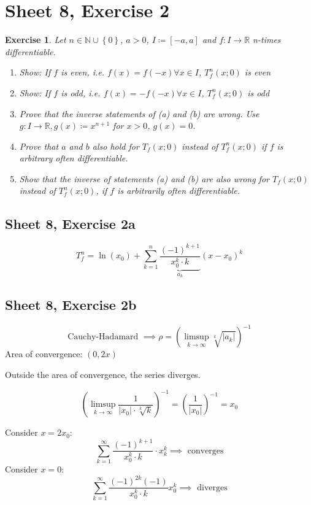 \documentclass{article}
\newtheorem{ex}{Exercise} %
\newcommand{\set}[1]{\left\{#1\right\}}
\newcommand{\card}[1]{\left|#1\right|}
\begin{document}
\section{Sheet 8, Exercise 2}
\begin{ex}
  Let $n \in \mathbb N \cup \set{0}$, $a > 0$, $I \coloneqq [-a, a]$ and $f: I \to \mathbb R$ n-times differentiable.
  \begin{enumerate}
    \item Show: If $f$ is even, i.e. $f(x) = f(-x) \forall x \in I$, $T_f^n(x; 0)$ is even
    \item Show: If $f$ is odd, i.e. $f(x) = -f(-x) \forall x \in I$, $T_f^n(x; 0)$ is odd
    \item Prove that the inverse statements of (a) and (b) are wrong.
      Use $g: I \to \mathbb R, g(x) \coloneqq x^{n+1}$ for $x > 0$, $g(x) = 0$.
    \item Prove that $a$ and $b$ also hold for $T_f(x; 0)$ instead of $T_f^n(x; 0)$ if $f$ is arbitrary often differentiable.
    \item Show that the inverse of statements (a) and (b) are also wrong for $T_f(x; 0)$ instead of $T_f^n(x; 0)$, if $f$ is arbitrarily often differentiable.
  \end{enumerate}
\end{ex}

\subsection{Sheet 8, Exercise 2a}

\[ T_f^n = \ln(x_0) + \sum_{k=1}^n \underbrace{\frac{(-1)^{k+1}}{x_0^k \cdot k}}_{a_k} (x - x_0)^k \]

\subsection{Sheet 8, Exercise 2b}

\[ \text{Cauchy-Hadamard } \implies \rho = \left(\limsup_{k \to \infty} \sqrt[k]{\card{a_k}}\right)^{-1} \]
Area of convergence: $(0, 2x)$

Outside the area of convergence, the series diverges.

\[ \left(\limsup_{k\to\infty} \frac{1}{\card{x_0} \cdot \sqrt[k]{k}}\right)^{-1} = \left(\frac{1}{\card{x_0}}\right)^{-1} = x_0 \]

Consider $x = 2x_0$:
\[ \sum_{k=1}^\infty \frac{(-1)^{k+1}}{x_0^k \cdot k} \cdot x_k^k \implies \text{ converges} \]
Consider $x = 0$:
\[ \sum_{k=1}^\infty \frac{(-1)^{2k} (-1)}{x_0^k \cdot k} x_0^k \implies \text{ diverges} \]
\end{document}
